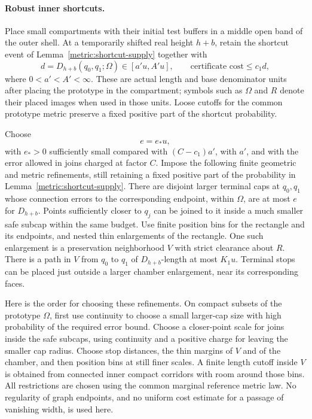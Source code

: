 \paragraph{Robust inner shortcuts.}
Place small compartments with their initial test buffers in a middle open
band of the outer shell. At a temporarily shifted real height $h+b$, retain
the shortcut event of Lemma~\ref{metric:shortcut-supply} together with
\begin{equation}\label{metric:shortcut-size}
 d=D_{h+b}(q_0,q_1;\Omega)\in[a'u,A'u],
 \qquad \text{certificate cost}\le c_1d,
\end{equation}
where $0<a'<A'<\infty$. These are actual length and base denominator units
after placing the prototype in the compartment; symbols such as $\Omega$
and $R$ denote their placed images when used in those units. Loose cutoffs
for the common prototype metric preserve a fixed positive part of the
shortcut probability.

Choose
\[
 e=e_*u,
\]
with $e_*>0$ sufficiently small compared with $(C-c_1)a'$, with $a'$, and
with the error allowed in joins charged at factor $C$. Impose the following
finite geometric and metric refinements, still retaining a fixed positive
part of the probability in Lemma~\ref{metric:shortcut-supply}.
There are disjoint larger terminal caps at $q_0,q_1$ whose connection errors
to the corresponding endpoint, within $\Omega$, are at most $e$ for
$D_{h+b}$. Points sufficiently closer to $q_j$ can be joined to it inside a
much smaller safe subcap within the same budget. Use finite position bins
for the rectangle and its endpoints, and nested thin enlargements of the
rectangle. One such enlargement is a preservation neighborhood $V$ with
strict clearance about $R$. There is a path in $V$ from $q_0$ to $q_1$ of
$D_{h+b}$-length at most $K_1u$. Terminal stops can be placed just outside a
larger chamber enlargement, near its corresponding faces.

Here is the order for choosing these refinements. On compact subsets of the
prototype $\Omega$, first use continuity to choose a small larger-cap size
with high probability of the required error bound. Choose a closer-point
scale for joins inside the safe subcaps, using continuity and a positive
charge for leaving the smaller cap radius. Choose stop distances, the thin
margins of $V$ and of the chamber, and then position bins at still finer
scales. A finite length cutoff inside $V$ is obtained from connected inner
compact corridors with room around those bins. All restrictions are chosen
using the common marginal reference metric law. No regularity of graph
endpoints, and no uniform cost estimate for a passage of vanishing width,
is used here.

